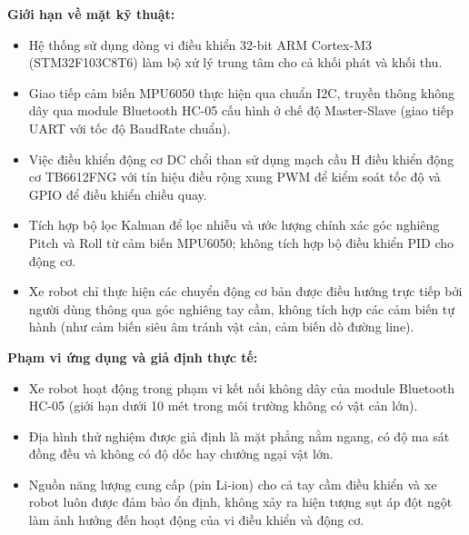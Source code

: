 \textbf{Giới hạn về mặt kỹ thuật:}
\begin{itemize}
    \item Hệ thống sử dụng dòng vi điều khiển 32-bit ARM Cortex-M3 (STM32F103C8T6) làm bộ xử lý trung tâm cho cả khối phát và khối thu.
    \item Giao tiếp cảm biến MPU6050 thực hiện qua chuẩn I2C, truyền thông không dây qua module Bluetooth HC-05 cấu hình ở chế độ Master-Slave (giao tiếp UART với tốc độ BaudRate chuẩn).
    \item Việc điều khiển động cơ DC chổi than sử dụng mạch cầu H điều khiển động cơ TB6612FNG với tín hiệu điều rộng xung PWM để kiểm soát tốc độ và GPIO để điều khiển chiều quay.
    \item Tích hợp bộ lọc Kalman để lọc nhiễu và ước lượng chính xác góc nghiêng Pitch và Roll từ cảm biến MPU6050; không tích hợp bộ điều khiển PID cho động cơ.
    \item Xe robot chỉ thực hiện các chuyển động cơ bản được điều hướng trực tiếp bởi người dùng thông qua góc nghiêng tay cầm, không tích hợp các cảm biến tự hành (như cảm biến siêu âm tránh vật cản, cảm biến dò đường line).
\end{itemize}

\textbf{Phạm vi ứng dụng và giả định thực tế:}
\begin{itemize}
    \item Xe robot hoạt động trong phạm vi kết nối không dây của module Bluetooth HC-05 (giới hạn dưới 10 mét trong môi trường không có vật cản lớn).
    \item Địa hình thử nghiệm được giả định là mặt phẳng nằm ngang, có độ ma sát đồng đều và không có độ dốc hay chướng ngại vật lớn.
    \item Nguồn năng lượng cung cấp (pin Li-ion) cho cả tay cầm điều khiển và xe robot luôn được đảm bảo ổn định, không xảy ra hiện tượng sụt áp đột ngột làm ảnh hưởng đến hoạt động của vi điều khiển và động cơ.
\end{itemize}